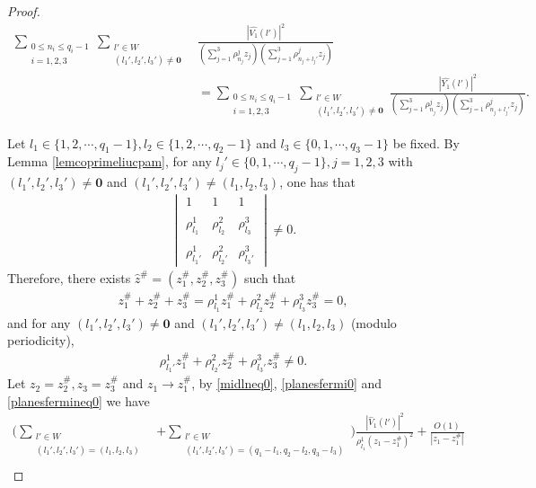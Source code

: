 \documentclass[12pt,letterpaper]{amsart}
\newcommand{\abs}[1]{\left\lvert #1 \right\rvert}
\begin{document}
\begin{proof}
\begin{align}
\sum_{\substack{0\leq n_i\leq q_i-1\\ i=1,2,3}}\sum_{\substack{l'\in W\\(l_1',l_2',l_3')\neq \mathbf{0}}}&\frac{\abs{\hat{V_1}(l')}^2}{\left(\sum_{j=1}^3\rho^j_{n_j}z_j\right)\left(\sum_{j=1}^3\rho^j_{n_j+l_j'}z_j\right)}\nonumber\\
&=\sum_{\substack{0\leq n_i\leq q_i-1\\ i=1,2,3}}\sum_{\substack{l'\in W\\(l_1',l_2',l_3')\neq \mathbf{0}}}\frac{\abs{\hat{Y_1}(l')}^2}{\left(\sum_{j=1}^3\rho^j_{n_j}z_j\right)\left(\sum_{j=1}^3\rho^j_{n_j+l_j'}z_j\right)}.\label{midlneq0}
\end{align}


Let $l_1\in \{1,2,\cdots,q_1-1\}, l_2\in\{1,2,\cdots,q_2-1\}$ and $l_3\in\{0,1,\cdots,q_3-1\}$ be fixed. By Lemma \ref{lemcoprimeliucpam}, for any $l_j'\in \{0,1,\cdots,q_j-1\},j=1,2,3$ with $(l_1',l_2',l_3')\neq \mathbf{0}$ and $(l_1',l_2',l_3')\neq (l_1,l_2,l_3)$, one has that
\begin{align}
\begin{vmatrix}
1 & 1 & 1 \\
\\
\rho^1_{l_1} & \rho^2_{l_2} &\rho^3_{l_3}\\
\\
\rho^1_{l_1'} & \rho^2_{l_2'} &\rho^3_{l_3'}
\end{vmatrix}\neq 0.\nonumber
\end{align}
Therefore, there exists $\hat{z}^{\#}=(z_1^{\#},z_2^{\#},z_3^{\#})$ such that
\begin{align}
z_1^{\#}+z_2^{\#}+z_3^{\#}=\rho^1_{l_1}z_1^{\#}+\rho^2_{l_2}z_2^{\#}+\rho^3_{l_3}z_3^{\#}=0,\label{planesfermi0}
\end{align}
and for any $(l_1',l_2',l_3')\neq \mathbf{0}$ and $(l_1',l_2',l_3')\neq (l_1,l_2,l_3)$ (modulo periodicity),
\begin{align}
\rho^1_{l_1'}z_1^{\#}+\rho^2_{l_2'}z_2^{\#}+\rho^3_{l_3'}z_3^{\#}\neq0.\label{planesfermineq0}
\end{align}
Let $z_2=z_2^{\#},z_3=z_3^{\#}$ and $z_1\to z_1^{\#}$, by \eqref{midlneq0}, \eqref{planesfermi0} and \eqref{planesfermineq0} we have
\begin{align}
\Bigg(\sum_{\substack{l'\in W\\ (l_1',l_2',l_3')=(l_1,l_2,l_3)}}&+\sum_{\substack{l'\in W\\ (l_1',l_2',l_3')=(q_1-l_1,q_2-l_2,q_3-l_3)}}\Bigg)\frac{\abs{\hat{V}_1(l')}^2}{\rho^1_{l_1}(z_1-z_1^{\#})^2}+\frac{O(1)}{\abs{z_1-z_1^{\#}}}\nonumber\\

\end{align}
\end{proof}
\end{document}
